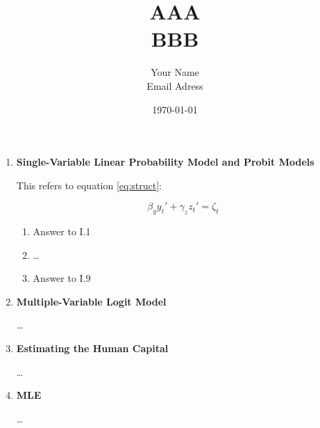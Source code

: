 \documentclass{article}
\title{AAA \\
    \normalsize BBB}
\date{\today}
\author{Your Name \\
        Email Adress}
\begin{document}
\maketitle

\begin{enumerate}[I]

\item \textbf{Single-Variable Linear Probability Model and Probit Models}

This refers to equation \ref{eq:struct}:

\begin{equation}\label{eq:struct}
    \beta_y y_t' + \gamma_z z_t' = \zeta_t
\end{equation}

%


\begin{enumerate}[1.]
    \item Answer to I.1
    
    \item \dots
    
    \item Answer to I.9
\end{enumerate}

\item\textbf{Multiple-Variable Logit Model}

\dots

\item\textbf{Estimating the Human Capital}

\dots

\item\textbf{MLE}

\dots

\end{enumerate}
\end{document}
